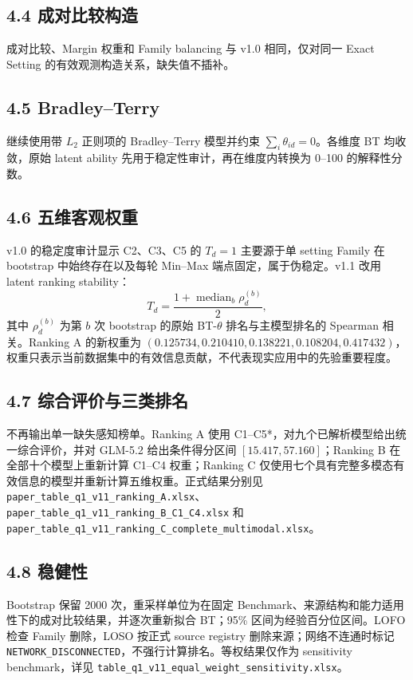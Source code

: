 \subsection{4.4 成对比较构造}
成对比较、Margin 权重和 Family balancing 与 v1.0 相同，仅对同一 Exact Setting 的有效观测构造关系，缺失值不插补。

\subsection{4.5 Bradley--Terry}
继续使用带 $L_2$ 正则项的 Bradley--Terry 模型并约束 $\sum_i\theta_{id}=0$。各维度 BT 均收敛，原始 latent ability 先用于稳定性审计，再在维度内转换为 0--100 的解释性分数。

\subsection{4.6 五维客观权重}
v1.0 的稳定度审计显示 C2、C3、C5 的 $T_d=1$ 主要源于单 setting Family 在 bootstrap 中始终存在以及每轮 Min--Max 端点固定，属于伪稳定。v1.1 改用 latent ranking stability：
\[
T_d=\frac{1+\operatorname{median}_b\rho_d^{(b)}}{2},
\]
其中 $\rho_d^{(b)}$ 为第 $b$ 次 bootstrap 的原始 BT-$\theta$ 排名与主模型排名的 Spearman 相关。Ranking A 的新权重为 $(0.125734,0.210410,0.138221,0.108204,0.417432)$，权重只表示当前数据集中的有效信息贡献，不代表现实应用中的先验重要程度。

\subsection{4.7 综合评价与三类排名}
不再输出单一缺失感知榜单。Ranking A 使用 C1--C5*，对九个已解析模型给出统一综合评价，并对 GLM-5.2 给出条件得分区间 $[15.417,57.160]$；Ranking B 在全部十个模型上重新计算 C1--C4 权重；Ranking C 仅使用七个具有完整多模态有效信息的模型并重新计算五维权重。正式结果分别见 \texttt{paper\_table\_q1\_v11\_ranking\_A.xlsx}、\texttt{paper\_table\_q1\_v11\_ranking\_B\_C1\_C4.xlsx} 和 \texttt{paper\_table\_q1\_v11\_ranking\_C\_complete\_multimodal.xlsx}。

\subsection{4.8 稳健性}
Bootstrap 保留 2000 次，重采样单位为在固定 Benchmark、来源结构和能力适用性下的成对比较结果，并逐次重新拟合 BT；95\% 区间为经验百分位区间。LOFO 检查 Family 删除，LOSO 按正式 source registry 删除来源；网络不连通时标记 \texttt{NETWORK\_DISCONNECTED}，不强行计算排名。等权结果仅作为 sensitivity benchmark，详见 \texttt{table\_q1\_v11\_equal\_weight\_sensitivity.xlsx}。

